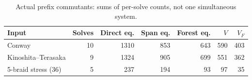 \begin{table}[htbp]
\centering\small
\setlength{\tabcolsep}{4pt}
\begin{tabular}{@{}lrrrrrr@{}}
\toprule
Input & Solves & Direct eq. & Span eq. & Forest eq. & $V$ & $V_F$\\\midrule
Conway & 10 & 1310 & 853 & 643 & 590 & 403\\
Kinoshita--Terasaka & 9 & 1324 & 905 & 699 & 551 & 362\\
5-braid stress (36) & 5 & 237 & 194 & 93 & 97 & 35\\
\bottomrule
\end{tabular}
\caption{Actual prefix commutants: sums of per-solve counts, not one simultaneous system.}
\label{tab:natural_counts}
\end{table}
